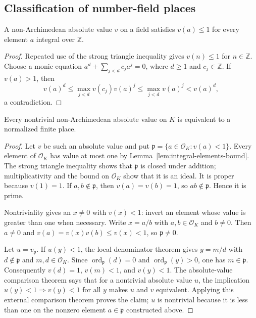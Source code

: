 \subsection{Classification of number-field places}

\begin{lemma}
\label{lem:integral-elements-bound}
\leanok
{}
A non-Archimedean absolute value $v$ on a field satisfies $v(a)\leq1$
for every element $a$ integral over $\mathbb Z$.
\end{lemma}
\begin{proof}
Repeated use of the strong triangle inequality gives $v(n)\leq1$ for
$n\in\mathbb Z$. Choose a monic equation
$a^d+\sum_{j<d}c_ja^j=0$, where $d\geq1$ and $c_j\in\mathbb Z$.
If $v(a)>1$, then
\[
 v(a)^d\leq\max_{j<d}v(c_j)v(a)^j
 \leq\max_{j<d}v(a)^j<v(a)^d,
\]
a contradiction.
\end{proof}

\begin{lemma}\label{lem:number-field-nonarchimedean-classification}
\leanok
{}
Every nontrivial non-Archimedean absolute value on $K$ is equivalent to
a normalized finite place.
\end{lemma}
\begin{proof}
Let $v$ be such an absolute value and put
$\mathfrak p=\{a\in\mathcal O_K:v(a)<1\}$. Every element of
$\mathcal O_K$ has value at most one by
Lemma~\ref{lem:integral-elements-bound}. The strong triangle inequality
shows that $\mathfrak p$ is closed under addition; multiplicativity and
the bound on $\mathcal O_K$ show that it is an ideal. It is proper because
$v(1)=1$. If $a,b\notin\mathfrak p$, then $v(a)=v(b)=1$, so
$ab\notin\mathfrak p$. Hence it is prime.

Nontriviality gives an $x\ne0$ with $v(x)<1$: invert an element whose
value is greater than one when necessary. Write $x=a/b$ with
$a,b\in\mathcal O_K$ and $b\ne0$. Then $a\ne0$ and
$v(a)=v(x)v(b)\leq v(x)<1$, so $\mathfrak p\ne0$.

Let $u=v_{\mathfrak p}$. If $u(y)<1$, the local denominator theorem
gives $y=m/d$ with $d\notin\mathfrak p$ and $m,d\in\mathcal O_K$.
Since $\operatorname{ord}_{\mathfrak p}(d)=0$ and
$\operatorname{ord}_{\mathfrak p}(y)>0$, one has $m\in\mathfrak p$.
Consequently $v(d)=1$, $v(m)<1$, and $v(y)<1$. The absolute-value
comparison theorem says that for a nontrivial absolute value $u$, the
implication $u(y)<1\Rightarrow v(y)<1$ for all $y$ makes $u$ and $v$
equivalent. Applying this external comparison theorem proves the claim;
$u$ is nontrivial because it is less than one on the nonzero element
$a\in\mathfrak p$ constructed above.
\end{proof}

